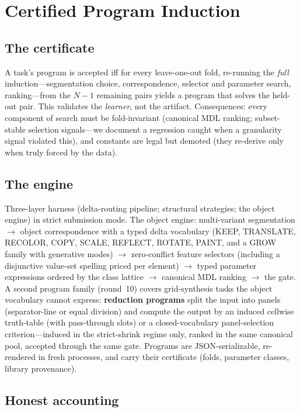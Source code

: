 \documentclass[11pt]{article}
\begin{document}
\section{Certified Program Induction}

\subsection{The certificate}

A task's program is accepted iff for every leave-one-out fold, re-running
the \emph{full} induction---segmentation choice, correspondence, selector
and parameter search, ranking---from the $N{-}1$ remaining pairs yields a
program that solves the held-out pair.  This validates the \emph{learner},
not the artifact.  Consequences: every component of search must be
fold-invariant (canonical MDL ranking; subset-stable selection
signals---we document a regression caught when a granularity signal
violated this), and constants are legal but demoted (they re-derive only
when truly forced by the data).

\subsection{The engine}

Three-layer harness (delta-routing pipeline; structural strategies; the
object engine) in strict submission mode.  The object engine:
multi-variant segmentation $\to$ object correspondence with a typed delta
vocabulary (KEEP, TRANSLATE, RECOLOR, COPY, SCALE, REFLECT, ROTATE, PAINT,
and a GROW family with generative modes) $\to$ zero-conflict feature
selectors (including a disjunctive value-set spelling priced per element)
$\to$ typed parameter expressions ordered by the class lattice $\to$
canonical MDL ranking $\to$ the gate.  A second program family (round~10)
covers grid-synthesis tasks the object vocabulary cannot express:
\textbf{reduction programs} split the input into panels (separator-line or
equal division) and compute the output by an induced cellwise truth-table
(with pass-through slots) or a closed-vocabulary panel-selection
criterion---induced in the strict-shrink regime only, ranked in the same
canonical pool, accepted through the same gate.  Programs are
JSON-serializable, re-rendered in fresh processes, and carry their
certificate (folds, parameter classes, library provenance).

\subsection{Honest accounting}
\end{document}

